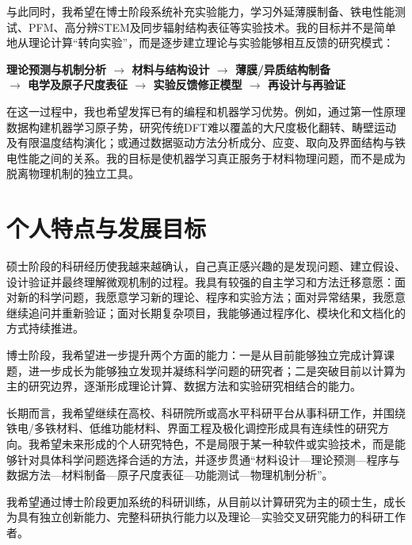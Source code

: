 与此同时，我希望在博士阶段系统补充实验能力，学习外延薄膜制备、铁电性能测试、PFM、高分辨STEM及同步辐射结构表征等实验技术。我的目标并不是简单地从理论计算“转向实验”，而是逐步建立理论与实验能够相互反馈的研究模式：

\begin{center}
\sffamily\small\bfseries\color{StatementTeal}
理论预测与机制分析 $\rightarrow$ 材料与结构设计 $\rightarrow$ 薄膜/异质结构制备\\[-0.1em]
$\rightarrow$ 电学及原子尺度表征 $\rightarrow$ 实验反馈修正模型 $\rightarrow$ 再设计与再验证
\end{center}

在这一过程中，我也希望发挥已有的编程和机器学习优势。例如，通过第一性原理数据构建机器学习原子势，研究传统DFT难以覆盖的大尺度极化翻转、畴壁运动及有限温度结构演化；或通过数据驱动方法分析成分、应变、取向及界面结构与铁电性能之间的关系。我的目标是使机器学习真正服务于材料物理问题，而不是成为脱离物理机制的独立工具。

\section{个人特点与发展目标}

硕士阶段的科研经历使我越来越确认，自己真正感兴趣的是发现问题、建立假设、设计验证并最终理解微观机制的过程。我具有较强的自主学习和方法迁移意愿：面对新的科学问题，我愿意学习新的理论、程序和实验方法；面对异常结果，我愿意继续追问并重新验证；面对长期复杂项目，我能够通过程序化、模块化和文档化的方式持续推进。

博士阶段，我希望进一步提升两个方面的能力：一是从目前能够独立完成计算课题，进一步成长为能够独立发现并凝练科学问题的研究者；二是突破目前以计算为主的研究边界，逐渐形成理论计算、数据方法和实验研究相结合的能力。

长期而言，我希望继续在高校、科研院所或高水平科研平台从事科研工作，并围绕铁电/多铁材料、低维功能材料、界面工程及极化调控形成具有连续性的研究方向。我希望未来形成的个人研究特色，不是局限于某一种软件或实验技术，而是能够针对具体科学问题选择合适的方法，并逐步贯通“材料设计—理论预测—程序与数据方法—材料制备—原子尺度表征—功能测试—物理机制分析”。

我希望通过博士阶段更加系统的科研训练，从目前以计算研究为主的硕士生，成长为具有独立创新能力、完整科研执行能力以及理论—实验交叉研究能力的科研工作者。